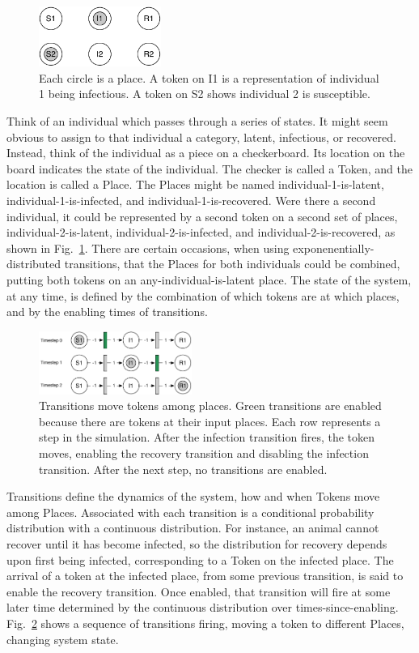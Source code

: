\documentclass{article}
\begin{document}
\begin{figure}
\centerline{\includegraphics[width=4cm]{place_with_tokens}}
\caption{Each circle is a place. A token on I1 is a representation
of individual 1 being infectious. A token on S2 shows individual 2
is susceptible.\label{fig:placewithtokens}}
\end{figure}%
Think of an individual which passes through a series of states.
It might seem obvious to assign to that individual a category,
latent, infectious, or recovered. Instead, think of the individual
as a piece on a checkerboard. Its location on the board indicates
the state of the individual. The checker is called a Token, and
the location is called a Place. The Places might be named
individual-1-is-latent, individual-1-is-infected, and individual-1-is-recovered.
Were there a second individual, it could be represented by a second
token on a second set of places,
individual-2-is-latent, individual-2-is-infected, and individual-2-is-recovered,
as shown in Fig.~\ref{fig:placewithtokens}.
There are certain occasions, when using exponenentially-distributed
transitions, that the Places for both individuals could be combined,
putting both tokens on an any-individual-is-latent place.
The state of the system, at any time, is defined by the
combination of which tokens are at which places, and by the
enabling times of transitions.

\begin{figure}
\centerline{\includegraphics[width=5cm]{move_tokens_sir}}
\caption{Transitions move tokens among places. Green transitions
are enabled because there are tokens at their input places.
Each row represents a step in the simulation. After the infection
transition fires, the token moves, enabling the recovery transition
and disabling the infection transition. After the next step,
no transitions are enabled.\label{fig:movetokenssir}}
\end{figure}%
Transitions define the dynamics of the system, how and when Tokens
move among Places. Associated with each transition is a
conditional probability distribution with a continuous distribution.
For instance, an animal cannot recover until it has become infected,
so the distribution for recovery depends upon first being infected,
corresponding to a Token on the infected place. The arrival
of a token at the infected place, from some previous transition,
is said to enable the recovery transition. Once enabled, that
transition will fire at some later time determined by the
continuous distribution over times-since-enabling.
Fig.~\ref{fig:movetokenssir} shows a sequence of transitions
firing, moving a token to different Places, changing system state.
\end{document}
